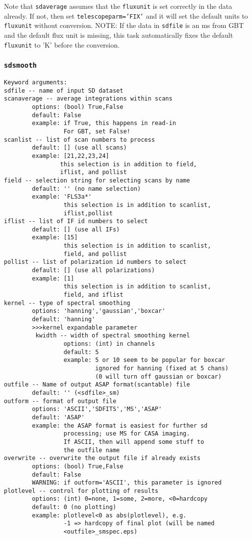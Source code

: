  Note that {\tt sdaverage} assumes that the {\tt fluxunit} is set correctly in
  the data already.  If not, then set {\tt telescopeparm='FIX'} and it
  will set the default units to {\tt fluxunit} without conversion.
  NOTE: If the data in {\tt sdfile} is an ms from GBT and the default flux
  unit is missing, this task automatically fixes the default {\tt fluxunit}
  to 'K' before the conversion.

  
\subsubsection{{\tt sdsmooth}}
\label{section:sd.sdtasks.tasks.sdsmooth}

\begin{verbatim}
Keyword arguments:
sdfile -- name of input SD dataset
scanaverage -- average integrations within scans
        options: (bool) True,False
        default: False
        example: if True, this happens in read-in
                 For GBT, set False!
scanlist -- list of scan numbers to process
        default: [] (use all scans)
        example: [21,22,23,24]
                this selection is in addition to field,
                iflist, and pollist
field -- selection string for selecting scans by name
        default: '' (no name selection)
        example: 'FLS3a*'
                 this selection is in addition to scanlist,
                 iflist,pollist
iflist -- list of IF id numbers to select
        default: [] (use all IFs)
        example: [15]
                 this selection is in addition to scanlist,
                 field, and pollist
pollist -- list of polarization id numbers to select
        default: [] (use all polarizations)
        example: [1]
                 this selection is in addition to scanlist,
                 field, and iflist
kernel -- type of spectral smoothing
        options: 'hanning','gaussian','boxcar'
        default: 'hanning'
        >>>kernel expandable parameter
         kwidth -- width of spectral smoothing kernel
                 options: (int) in channels
                 default: 5
                 example: 5 or 10 seem to be popular for boxcar
                          ignored for hanning (fixed at 5 chans)
                          (0 will turn off gaussian or boxcar)
outfile -- Name of output ASAP format(scantable) file
        default: '' (<sdfile>_sm)
outform -- format of output file
        options: 'ASCII','SDFITS','MS','ASAP'
        default: 'ASAP'
        example: the ASAP format is easiest for further sd
                 processing; use MS for CASA imaging.
                 If ASCII, then will append some stuff to
                 the outfile name
overwrite -- overwrite the output file if already exists
        options: (bool) True,False
        default: False
        WARNING: if outform='ASCII', this parameter is ignored
plotlevel -- control for plotting of results
        options: (int) 0=none, 1=some, 2=more, <0=hardcopy
        default: 0 (no plotting)
        example: plotlevel<0 as abs(plotlevel), e.g.
                 -1 => hardcopy of final plot (will be named
                 <outfile>_smspec.eps)
\end{verbatim}

